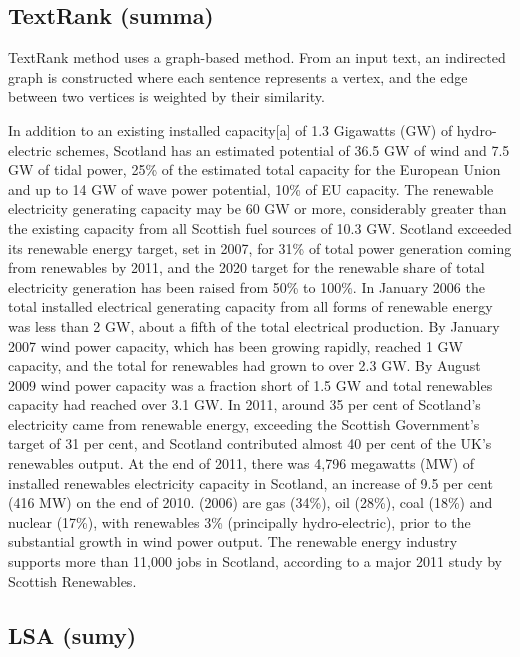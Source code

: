 \subsection{TextRank (summa)}

TextRank method \citep{04-mihalcea-tarau} uses a graph-based method. 
From an input text, an indirected graph is constructed where each sentence represents a vertex, and the edge between two vertices is weighted by their similarity. 

\begin{tcolorbox}\footnotesize
	In addition to an existing installed capacity[a] of 1.3 Gigawatts (GW) of hydro-electric schemes, Scotland has an estimated potential of 36.5 GW of wind and 7.5 GW of tidal power, 25\% of the estimated total capacity for the European Union and up to 14 GW of wave power potential, 10\% of EU capacity.
	The renewable electricity generating capacity may be 60 GW or more, considerably greater than the existing capacity from all Scottish fuel sources of 10.3 GW.
	Scotland exceeded its renewable energy target, set in 2007, for 31\% of total power generation coming from renewables by 2011, and the 2020 target for the renewable share of total electricity generation has been raised from 50\% to 100\%.
	In January 2006 the total installed electrical generating capacity from all forms of renewable energy was less than 2 GW, about a fifth of the total electrical production.
	By January 2007 wind power capacity, which has been growing rapidly, reached 1 GW capacity, and the total for renewables had grown to over 2.3 GW.
	By August 2009 wind power capacity was a fraction short of 1.5 GW and total renewables capacity had reached over 3.1 GW.
	In 2011, around 35 per cent of Scotland’s electricity came from renewable energy, exceeding the Scottish Government’s target of 31 per cent, and Scotland contributed almost 40 per cent of the UK’s renewables output.
	At the end of 2011, there was 4,796 megawatts (MW) of installed renewables electricity capacity in Scotland, an increase of 9.5 per cent (416 MW) on the end of 2010.
	(2006) are gas (34\%), oil (28\%), coal (18\%) and nuclear (17\%), with renewables 3\% (principally hydro-electric), prior to the substantial growth in wind power output.
	The renewable energy industry supports more than 11,000 jobs in Scotland, according to a major 2011 study by Scottish Renewables.
\end{tcolorbox}

\subsection{LSA (sumy)}

